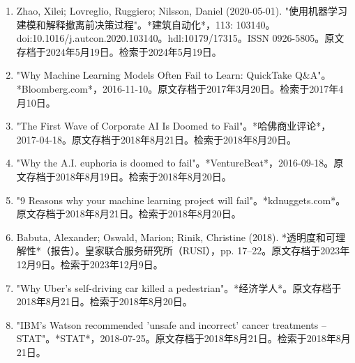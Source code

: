 \begin{enumerate}
\item Zhao, Xilei; Lovreglio, Ruggiero; Nilsson, Daniel (2020-05-01). "使用机器学习建模和解释撤离前决策过程"。*建筑自动化*，113: 103140。doi:10.1016/j.autcon.2020.103140。hdl:10179/17315。ISSN 0926-5805。原文存档于2024年5月19日。检索于2024年5月19日。
\item "Why Machine Learning Models Often Fail to Learn: QuickTake Q&A"。*Bloomberg.com*，2016-11-10。原文存档于2017年3月20日。检索于2017年4月10日。
\item "The First Wave of Corporate AI Is Doomed to Fail"。*哈佛商业评论*，2017-04-18。原文存档于2018年8月21日。检索于2018年8月20日。
\item "Why the A.I. euphoria is doomed to fail"。*VentureBeat*，2016-09-18。原文存档于2018年8月19日。检索于2018年8月20日。
\item "9 Reasons why your machine learning project will fail"。*kdnuggets.com*。原文存档于2018年8月21日。检索于2018年8月20日。
\item Babuta, Alexander; Oswald, Marion; Rinik, Christine (2018). *透明度和可理解性*（报告）。皇家联合服务研究所（RUSI），pp. 17–22。原文存档于2023年12月9日。检索于2023年12月9日。
\item "Why Uber's self-driving car killed a pedestrian"。*经济学人*。原文存档于2018年8月21日。检索于2018年8月20日。
\item "IBM's Watson recommended 'unsafe and incorrect' cancer treatments – STAT"。*STAT*，2018-07-25。原文存档于2018年8月21日。检索于2018年8月21日。
\end{enumerate}